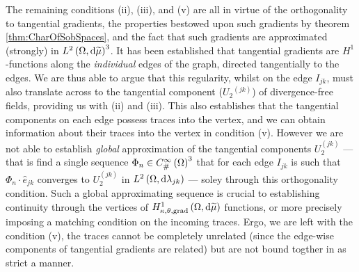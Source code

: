 The remaining conditions (ii), (iii), and (v) are all in virtue of the orthogonality to tangential gradients, the properties bestowed upon such gradients by theorem \ref{thm:CharOfSobSpaces}, and the fact that such gradients are approximated (strongly) in $L^{2}\left( \Omega,\mathrm{d} \widetilde{\mu} \right)^3$.
It has been established that tangential gradients are $H^1$-functions along the \emph{individual} edges of the graph, directed tangentially to the edges.
We are thus able to argue that this regularity, whilst on the edge $I_{jk}$, must also translate across to the tangential component ($U{_2}^{(jk)}$) of divergence-free fields, providing us with (ii) and (iii).
This also establishes that the tangential components on each edge possess traces into the vertex, and we can obtain information about their traces into the vertex in condition (v).
However we are not able to establish \emph{global} approximation of the tangential components $U_2^{(jk)}$ --- that is find a single sequence $\Phi_n\in C^{\infty}_{\#}\left( \Omega \right)^3$ that for each edge $I_{jk}$ is such that $\Phi_n\cdot\widehat{e}_{jk}$ converges to $U_2^{(jk)}$ in $L^{2}\left( \Omega,\mathrm{d} \lambda_{jk} \right)$ --- soley through this orthogonality condition.
Such a global approximating sequence is crucial to establishing continuity through the vertices of $H^1_{\kappa,\theta,\mathrm{grad}}\left( \Omega, \mathrm{d}\widetilde{\mu} \right)$ functions, or more precisely imposing a matching condition on the incoming traces.
Ergo, we are left with the condition (v), the traces cannot be completely unrelated (since the edge-wise components of tangential gradients are related) but are not bound togther in as strict a manner.

